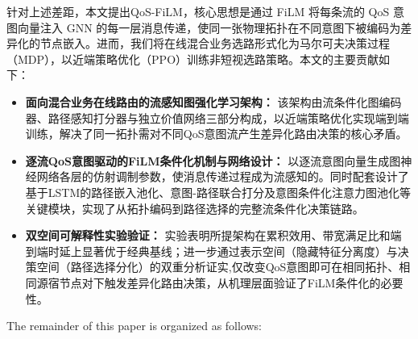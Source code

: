 针对上述差距，本文提出QoS-FiLM，核心思想是通过 FiLM 将每条流的 QoS 意图向量注入 GNN 的每一层消息传递，使同一张物理拓扑在不同意图下被编码为差异化的节点嵌入。进而，我们将在线混合业务选路形式化为马尔可夫决策过程（MDP），以近端策略优化（PPO）训练非短视选路策略。本文的主要贡献如下：
\begin{itemize}
    \item \textbf{面向混合业务在线路由的流感知图强化学习架构：}
    该架构由流条件化图编码器、路径感知打分器与独立价值网络三部分构成，以近端策略优化实现端到端训练，解决了同一拓扑需对不同QoS意图流产生差异化路由决策的核心矛盾。

    \item \textbf{逐流QoS意图驱动的FiLM条件化机制与网络设计：}
    以逐流意图向量生成图神经网络各层的仿射调制参数，使消息传递过程成为流感知的。同时配套设计了基于LSTM的路径嵌入池化、意图-路径联合打分及意图条件化注意力图池化等关键模块，实现了从拓扑编码到路径选择的完整流条件化决策链路。

    \item \textbf{双空间可解释性实验验证：}
    实验表明所提架构在累积效用、带宽满足比和端到端时延上显著优于经典基线；进一步通过表示空间（隐藏特征分离度）与决策空间（路径选择分化）的双重分析证实,仅改变QoS意图即可在相同拓扑、相同源宿节点对下触发差异化路由决策，从机理层面验证了FiLM条件化的必要性。
\end{itemize}

The remainder of this paper is organized as follows:
